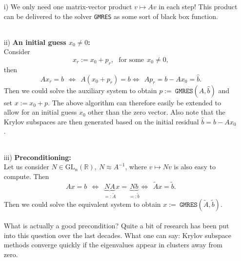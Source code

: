 \begin{frame}
		\begin{itemize}
			\item [i)]
			We only need one matrix-vector product $v\mapsto Av$ in each step! This product can be delivered to the solver \texttt{GMRES} as some sort of black box function.\\~\\
			\item [ii)] \textbf{An initial guess $x_0\neq 0$:}\\
			Consider $$x_r:=x_0+p_r,~~~\text{for some}~~x_0\neq 0,$$
			then
			$$Ax_r=b~~\Leftrightarrow~~A(x_0+p_r)=b	\Leftrightarrow~~Ap_r=b-Ax_0=\widehat{b}.$$
			Then we could solve the auxiliary system to obtain $p:=~\texttt{GMRES}(A,\widehat{b})$ and set
			$x:=x_0+p$. The above algorithm can therefore easily be extended to allow for an initial guess $x_0$ other than the zero vector. Also note that the Krylov subspaces are then generated based on the initial residual $\widehat{b}=b-Ax_0$.\\~\\
			\item [iii)]  \textbf{Preconditioning:} \\
			Let us consider $N\in \text{GL}_n(\mathbb{R}),~N\approx A^{-1}$, where $v\mapsto Nv$ is also easy to compute. Then
			$$
			Ax=b~~\Leftrightarrow~~\underbrace{NA}_{=:\widetilde{A}}x=\underbrace{Nb}_{=:\widetilde{b}}
			\Leftrightarrow~~\widetilde{A}x=\widetilde{b}.
			$$
			Then we could solve the equivalent system to obtain $x:=~\texttt{GMRES}(\widetilde{A},\widetilde{b})$.\\~\\
		    What is actually a good precondition?  Quite a bit of research has been put into this question over the last decades. What one can say: Krylov subspace methods converge quickly if the eigenvalues appear in clusters away from zero.
		\end{itemize}

\end{frame}

